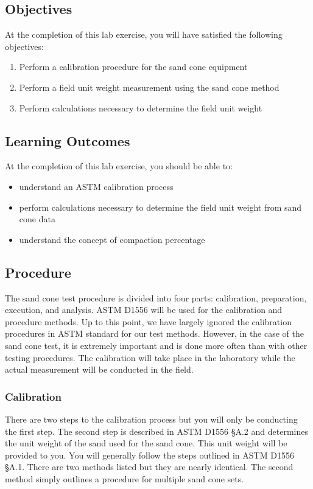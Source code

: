 \documentclass[12pt]{article}
\begin{document}
\subsection{Objectives}
\label{ssec:headingscap}
At the completion of this lab exercise, you will have satisfied the following objectives:
\begin{enumerate}
    \item Perform a calibration procedure for the sand cone equipment
    \item Perform a field unit weight measurement using the sand cone method
    \item Perform calculations necessary to determine the field unit weight
\end{enumerate}

\subsection{Learning Outcomes}
At the completion of this lab exercise, you should be able to:
\begin{itemize}
    \item understand an ASTM calibration process
    \item perform calculations necessary to determine the field unit weight from sand cone data
    \item understand the concept of compaction percentage
\end{itemize}

\pagebreak
\subsection{Procedure}
The sand cone test procedure is divided into four parts: calibration, preparation, execution, and analysis. ASTM D1556 will be used for the calibration and procedure methods. Up to this point, we have largely ignored the calibration procedures in ASTM standard for our test methods. However, in the case of the sand cone test, it is extremely important and is done more often than with other testing procedures. The calibration will take place in the laboratory while the actual measurement will be conducted in the field.

\subsubsection{Calibration}
There are two steps to the calibration process but you will only be conducting the first step. The second step is described in ASTM D1556 \S A.2 and determines the unit weight of the sand used for the sand cone. This unit weight will be provided to you. You will generally follow the steps outlined in ASTM D1556 \S A.1. There are two methods listed but they are nearly identical. The second method simply outlines a procedure for multiple sand cone sets.
\end{document}
